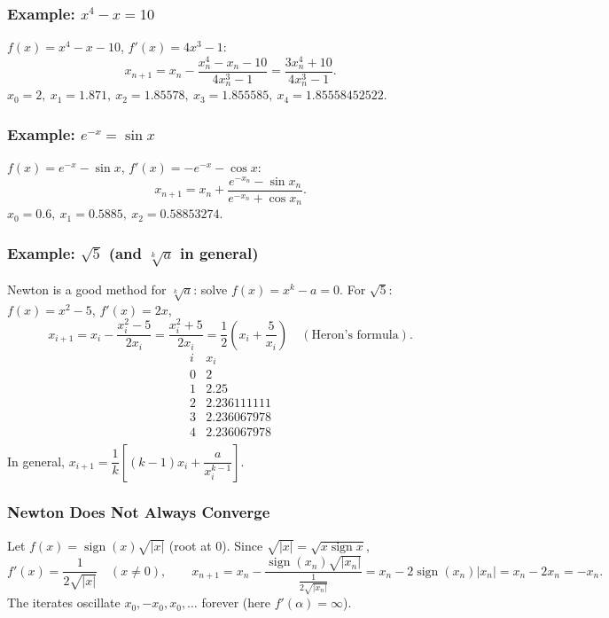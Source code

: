 \documentclass[hidelinks]{article}
\newcommand{\abs}[1]{\left|#1\right|}
\begin{document}
\subsubsection{Example: $x^4-x=10$}

$f(x)=x^4-x-10$, $f'(x)=4x^3-1$:
\[
x_{n+1}=x_n-\frac{x_n^4-x_n-10}{4x_n^3-1}=\frac{3x_n^4+10}{4x_n^3-1}.
\]
$x_0=2,\ x_1=1.871,\ x_2=1.85578,\ x_3=1.855585,\ x_4=1.85558452522$.

\subsubsection{Example: $e^{-x}=\sin x$}

$f(x)=e^{-x}-\sin x$, $f'(x)=-e^{-x}-\cos x$:
\[
x_{n+1}=x_n+\frac{e^{-x_n}-\sin x_n}{e^{-x_n}+\cos x_n}.
\]
$x_0=0.6,\ x_1=0.5885,\ x_2=0.58853274$.

\subsubsection{Example: $\sqrt5$ (and $\sqrt[k]{a}$ in general)}

Newton is a good method for $\sqrt[k]{a}$: solve $f(x)=x^k-a=0$. For $\sqrt5$: $f(x)=x^2-5$, $f'(x)=2x$,
\[
x_{i+1}=x_i-\frac{x_i^2-5}{2x_i}=\frac{x_i^2+5}{2x_i}=\frac12\left(x_i+\frac5{x_i}\right)\quad(\text{Heron's formula}).
\]
\[
\begin{array}{cc}
i & x_i\\ \hline
0 & 2\\
1 & 2.25\\
2 & 2.236111111\\
3 & 2.236067978\\
4 & 2.236067978\\
\end{array}
\]
In general, $x_{i+1}=\dfrac1k\left[(k-1)x_i+\dfrac{a}{x_i^{k-1}}\right]$.

\subsubsection{Newton Does Not Always Converge}

Let $f(x)=\operatorname{sign}(x)\sqrt{\abs x}$ (root at $0$). Since $\sqrt{\abs x}=\sqrt{x\operatorname{sign}x}$,
\[
f'(x)=\frac{1}{2\sqrt{\abs x}}\quad(x\neq0),\qquad
x_{n+1}=x_n-\frac{\operatorname{sign}(x_n)\sqrt{\abs{x_n}}}{\frac{1}{2\sqrt{\abs{x_n}}}}=x_n-2\operatorname{sign}(x_n)\abs{x_n}=x_n-2x_n=-x_n .
\]
The iterates oscillate $x_0,-x_0,x_0,\dots$ forever (here $f'(\alpha)=\infty$).
\end{document}
